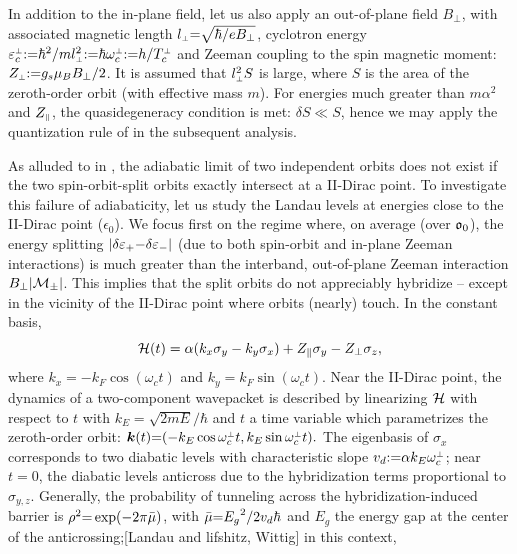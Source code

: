 \documentclass[aps, prb, showpacs, twocolumn, notitlepage, superscriptaddress]{revtex4-1}
\begin{document}
In addition to the in-plane field, let us also apply an out-of-plane field $B_{\perp}$, with associated magnetic length $l_{\scriptscriptstyle{\perp}}{=}\sqrt{\hbar/eB_{\perp}}$, cyclotron energy $\varepsilon^{\scriptscriptstyle{\perp}}_c{:}{=}\hbar^2/ml_{\scriptscriptstyle{\perp}}^2{:}{=}\hbar \omega_c^{\scriptscriptstyle{\perp}}{:}{=}h/T_c^{\scriptscriptstyle{\perp}}$ and Zeeman coupling to the spin magnetic moment:  $Z_{\scriptscriptstyle{\perp}}{:}{=}{g_s}\mu_B B_{\perp}/2$. It is assumed that $l_{\scriptscriptstyle{\perp}}^2S$ is large, where $S$ is the area of the zeroth-order orbit (with effective mass $m$). For energies much greater than $m\alpha^2$ and $Z_{\scriptscriptstyle{\parallel}}$, the quasidegeneracy condition is met: $\delta S{\ll}S$, hence we may apply the quantization rule of  in the subsequent analysis. 

As alluded to in , the adiabatic limit of two independent orbits does not exist if the two spin-orbit-split orbits exactly intersect at a II-Dirac point. To investigate this failure of adiabaticity, let us study the Landau levels at energies close to the II-Dirac point ($\epsilon_0$). We focus first on the regime where, on average (over $\mathfrak{o}_0$), the energy splitting $|\delta \varepsilon_+{-}\delta \varepsilon_-|$ (due to both spin-orbit and in-plane Zeeman interactions) is much greater than the interband, out-of-plane Zeeman interaction $B_{\perp}|{\cal M}_{\pm}|$. This implies that the split orbits do not appreciably hybridize -- except in the vicinity of the II-Dirac point where orbits (nearly) touch. In the constant basis, 
\begin{equation}
{\cal H}(t)=\alpha(k_{x}\sigma_{y}-k_{y}\sigma_{x})+Z_\parallel\sigma_{y}-Z_\perp\sigma_{z},\label{calHRZ}
\end{equation}
where $k_x=-k_F \cos(\omega_c t)$ and $k_y=k_F \sin(\omega_c t)$. Near the II-Dirac point, the dynamics of a two-component wavepacket is described by linearizing $\mathcal{H}$ with respect to $t$
with $k_E{=}\sqrt{2mE}/\hbar$ and  $t$ a time variable which parametrizes the zeroth-order orbit:
$\boldsymbol{k}(t){=}({-}k_E \cos \omega_c^{\scriptscriptstyle{\perp}} t, k_E \sin \omega_c^{\scriptscriptstyle{\perp}} t ).$ 
The eigenbasis of $\sigma_x$ corresponds to two diabatic levels with characteristic slope $v_d{:}{=}\alpha k_E\omega^{\scriptscriptstyle{\perp}}_c$; near $t{=}0$, the diabatic levels anticross  due to the hybridization terms proportional to $\sigma_{y,z}$. Generally, the probability of tunneling across the hybridization-induced barrier is  $\rho^2{=}\exp(-2\pi\bar{\mu})$, with $\bar{\mu}{=}{E_g}^2/{2v_d \hbar}$ and $E_g$ the energy gap at the center of the anticrossing;[Landau and lifshitz, Wittig] in this context,
\end{document}
